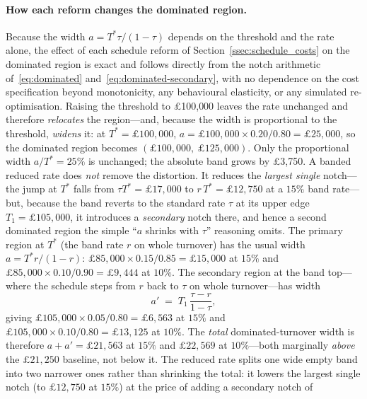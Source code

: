 \paragraph{How each reform changes the dominated region.} Because the width
$a=T^{*}\tau/(1-\tau)$ depends on the threshold and the rate alone, the effect of
each schedule reform of Section~\ref{ssec:schedule_costs} on the dominated
region is exact and follows directly from the notch arithmetic
of~\eqref{eq:dominated} and~\eqref{eq:dominated-secondary}, with no dependence on
the cost specification beyond monotonicity, any behavioural elasticity, or any simulated
re-optimisation. Raising the threshold to \pounds100{,}000 leaves the rate
unchanged and therefore \emph{relocates} the region---and, because the width is
proportional to the threshold, \emph{widens} it: at $T^{*}=\pounds100{,}000$,
$a=\pounds100{,}000\times0.20/0.80=\pounds25{,}000$, so the dominated region
becomes $(\pounds100{,}000,\ \pounds125{,}000)$. Only the proportional width
$a/T^{*}=25\%$ is unchanged; the absolute band grows by \pounds3{,}750. A banded reduced
rate does \emph{not} remove the distortion. It reduces the \emph{largest single}
notch---the jump at $T^{*}$ falls from $\tau T^{*}=\pounds17{,}000$ to
$r\,T^{*}=\pounds12{,}750$ at a $15\%$ band rate---but, because the band reverts to
the standard rate $\tau$ at its upper edge $T_{1}=\pounds105{,}000$, it introduces a
\emph{secondary} notch there, and hence a second dominated region the simple
``$a$ shrinks with $\tau$'' reasoning omits. The primary region at $T^{*}$ (the
band rate $r$ on whole turnover) has the usual width
$a=T^{*}r/(1-r)$: $\pounds85{,}000\times0.15/0.85=\pounds15{,}000$ at $15\%$ and
$\pounds85{,}000\times0.10/0.90=\pounds9{,}444$ at $10\%$. The secondary region at
the band top---where the schedule steps from $r$ back to $\tau$ on whole
turnover---has width
\begin{equation}
  a' \;=\; T_{1}\,\frac{\tau-r}{1-\tau},
  \label{eq:dominated-secondary}
\end{equation}
giving $\pounds105{,}000\times0.05/0.80=\pounds6{,}563$ at $15\%$ and
$\pounds105{,}000\times0.10/0.80=\pounds13{,}125$ at $10\%$. The \emph{total}
dominated-turnover width is therefore $a+a'=\pounds21{,}563$ at $15\%$ and
$\pounds22{,}569$ at $10\%$---both marginally \emph{above} the $\pounds21{,}250$
baseline, not below it. The reduced rate splits one wide empty band into two
narrower ones rather than shrinking the total: it lowers the largest single notch
(to $\pounds12{,}750$ at $15\%$) at the price of adding a secondary notch of

